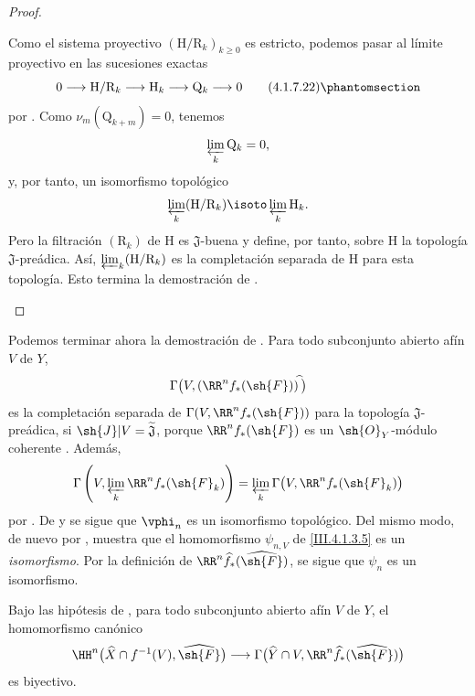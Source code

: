 \documentclass[oneside]{amsart}
\renewcommand{\geq}{\geqslant}
\let\EGAOriginalLabel\label
\renewcommand{\label}[1]{\phantomsection\EGAOriginalLabel{#1}}
\begin{document}
\begin{proof}
\begin{env}[4.1.7.21]
Como el sistema proyectivo
$(\mathrm{H}/\mathrm{R}_k)_{k\geq0}$ es estricto, podemos pasar al
límite proyectivo en las sucesiones exactas
\[
  0
  \longrightarrow
  \mathrm{H}/\mathrm{R}_k
  \longrightarrow
  \mathrm{H}_k
  \longrightarrow
  \mathrm{Q}_k
  \longrightarrow
  0
  \tag{4.1.7.22}
  \label{III.4.1.7.22}
\]
por .
Como $\nu_m(\mathrm{Q}_{k+m})=0$, tenemos
\[
  \varprojlim_k\mathrm{Q}_k=0,
\]
y, por tanto, un isomorfismo topológico
\[
  \varprojlim_k(\mathrm{H}/\mathrm{R}_k)
  \isoto
  \varprojlim_k\mathrm{H}_k.
\]
Pero la filtración $(\mathrm{R}_k)$ de $\mathrm{H}$ es
$\mathfrak{J}$-buena y define, por tanto, sobre $\mathrm{H}$ la
topología $\mathfrak{J}$-preádica.
Así, $\varprojlim_k(\mathrm{H}/\mathrm{R}_k)$ es la completación
separada de $\mathrm{H}$ para esta topología.
Esto termina la demostración de .
\end{env}
\end{proof}

\begin{env}[4.1.8]
\label{III.4.1.8}
Podemos terminar ahora la demostración de .
Para todo subconjunto abierto afín $V$ de $Y$,
\[
  \Gamma\bigl(
    V,(\RR^n f_*(\sh{F}))^{\widehat{\,}}
  \bigr)
\]
es la completación separada de
$\Gamma(V,\RR^n f_*(\sh{F}))$ para la topología
$\mathfrak{J}$-preádica, si
$\sh{J}|V=\widetilde{\mathfrak{J}}$, porque
$\RR^n f_*(\sh{F})$ es un $\sh{O}_Y$-módulo coherente
.
Además,
\[
  \Gamma\left(
    V,\varprojlim_k\RR^n f_*(\sh{F}_k)
  \right)
  =
  \varprojlim_k
  \Gamma\bigl(V,\RR^n f_*(\sh{F}_k)\bigr)
\]
por .
De  y  se sigue que
$\vphi_n$ es un isomorfismo topológico.
Del mismo modo, de nuevo por , 
muestra que el homomorfismo $\psi_{n,V}$ de \eqref{III.4.1.3.5} es un
\emph{isomorfismo}.
Por la definición de
$\RR^n\widehat{f}_*(\widehat{\sh{F}})$, se sigue que $\psi_n$ es un
isomorfismo.
\end{env}

\begin{corollary}[4.1.9]
\label{III.4.1.9}
Bajo las hipótesis de \textup{}, para todo subconjunto abierto
afín $V$ de $Y$, el homomorfismo canónico
\[
  \HH^n\bigl(
    \widehat{X}\cap f^{-1}(V),
    \widehat{\sh{F}}
  \bigr)
  \longrightarrow
  \Gamma\bigl(
    \widehat{Y}\cap V,
    \RR^n\widehat{f}_*(\widehat{\sh{F}})
  \bigr)
\]
es biyectivo.
\end{corollary}
\end{document}
